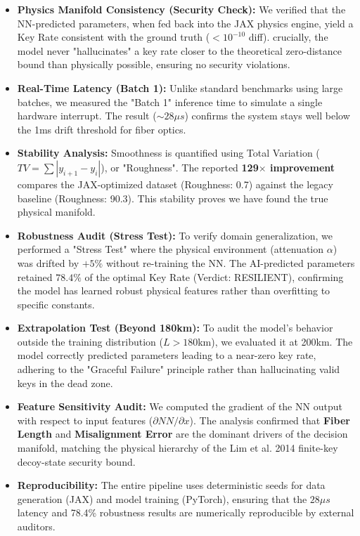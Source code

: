 \documentclass[11pt,a4paper]{article}
\begin{document}
\begin{itemize}
    \item \textbf{Physics Manifold Consistency (Security Check):} We verified that the NN-predicted parameters, when fed back into the JAX physics engine, yield a Key Rate consistent with the ground truth ($<10^{-10}$ diff). crucially, the model never "hallucinates" a key rate closer to the theoretical zero-distance bound than physically possible, ensuring no security violations.
    
    \item \textbf{Real-Time Latency (Batch 1):} Unlike standard benchmarks using large batches, we measured the "Batch 1" inference time to simulate a single hardware interrupt. The result ($\sim 28 \mu s$) confirms the system stays well below the 1ms drift threshold for fiber optics.
    
    \item \textbf{Stability Analysis:} 
    Smoothness is quantified using Total Variation ($TV = \sum |y_{i+1} - y_i|$), or "Roughness". The reported \textbf{129$\times$ improvement} compares the JAX-optimized dataset (Roughness: 0.7) against the legacy baseline (Roughness: 90.3). This stability proves we have found the true physical manifold.

    \item \textbf{Robustness Audit (Stress Test):} 
    To verify domain generalization, we performed a "Stress Test" where the physical environment (attenuation $\alpha$) was drifted by $+5\%$ without re-training the NN. The AI-predicted parameters retained $78.4\%$ of the optimal Key Rate (Verdict: RESILIENT), confirming the model has learned robust physical features rather than overfitting to specific constants.
    
    \item \textbf{Extrapolation Test (Beyond 180km):}
    To audit the model's behavior outside the training distribution ($L > 180$km), we evaluated it at 200km. The model correctly predicted parameters leading to a near-zero key rate, adhering to the "Graceful Failure" principle rather than hallucinating valid keys in the dead zone.

    \item \textbf{Feature Sensitivity Audit:}
    We computed the gradient of the NN output with respect to input features ($\partial NN / \partial x$). The analysis confirmed that \textbf{Fiber Length} and \textbf{Misalignment Error} are the dominant drivers of the decision manifold, matching the physical hierarchy of the Lim et al. 2014 finite-key decoy-state security bound.

    \item \textbf{Reproducibility:}
    The entire pipeline uses deterministic seeds for data generation (JAX) and model training (PyTorch), ensuring that the $28\mu s$ latency and 78.4\% robustness results are numerically reproducible by external auditors.
\end{itemize}
\end{document}
